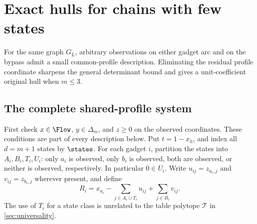 \section{Exact hulls for chains with few states}\label{sec:fixed-chains}

For the same graph $G_L$, arbitrary observations on either gadget arc
and on the bypass admit a small common-profile description. Eliminating
the residual profile coordinate sharpens the general determinant bound
and gives a unit-coefficient original hull when $m\le3$.

\subsection{The complete shared-profile system}

First check $x\in\Flow$, $y\in\Delta_m$, and $z\ge0$ on the
observed coordinates. These conditions are part of every description
below. Put $t=1-x_h$, and index all $d=m+1$ states by $\states$.
For each gadget $i$, partition the states into $A_i,B_i,T_i,U_i$:
only $a_i$ is observed, only $b_i$ is observed, both are observed,
or neither is observed, respectively. In particular $0\in U_i$.
Write $u_{ij}=z_{a_i,j}$ and $v_{ij}=z_{b_i,j}$ wherever present,
and define
\begin{equation}\label{eq:chain-R}
 R_i=x_{a_i}-\sum_{j\in A_i\cup T_i}u_{ij}
                  +\sum_{j\in B_i}v_{ij}.
\end{equation}
The use of $T_i$ for a state class is unrelated to the table polytope
$\mathcal T$ in \cref{sec:universality}.

